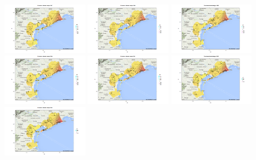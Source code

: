 \documentclass[a4paper,11pt,twoside,openright]{book}							%
\begin{document}
\begin{figure}[H]
\centering
\includegraphics[trim=0cm 0cm 4cm 0cm,clip=true,width=0.32\textwidth]{Immagini/venezia_con_covariate/Maps1997.png}
\includegraphics[trim=0cm 0cm 4cm 0cm,clip=true,width=0.32\textwidth]{Immagini/venezia_con_covariate/Maps1998.png}
\includegraphics[trim=0cm 0cm 4cm 0cm,clip=true,width=0.32\textwidth]{Immagini/venezia_con_covariate/Maps1999.png}
\includegraphics[trim=0cm 0cm 4cm 0cm,clip=true,width=0.32\textwidth]{Immagini/venezia_con_covariate/Maps2000.png}
\includegraphics[trim=0cm 0cm 4cm 0cm,clip=true,width=0.32\textwidth]{Immagini/venezia_con_covariate/Maps2001.png}
\includegraphics[trim=0cm 0cm 4cm 0cm,clip=true,width=0.32\textwidth]{Immagini/venezia_con_covariate/Maps2002.png}
\includegraphics[trim=0cm 0cm 4cm 0cm,clip=true,width=0.32\textwidth]{Immagini/venezia_con_covariate/Maps2003.png}

\end{figure}
\end{document}
